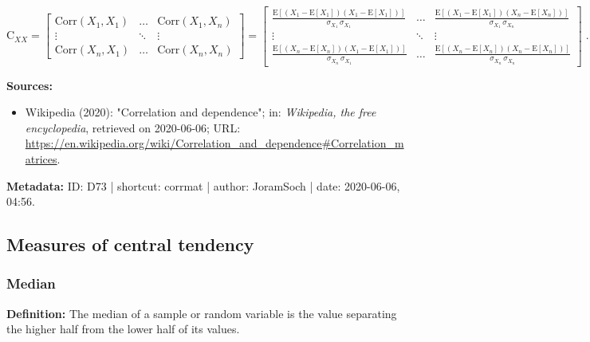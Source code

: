 \documentclass[a4paper,12pt,twoside]{book}
\begin{document}
\begin{equation} \label{eq:corrmat-corrmat}
\mathrm{C}_{XX} =
\begin{bmatrix}
\mathrm{Corr}(X_1,X_1) & \ldots & \mathrm{Corr}(X_1,X_n) \\
\vdots & \ddots & \vdots \\
\mathrm{Corr}(X_n,X_1) & \ldots & \mathrm{Corr}(X_n,X_n)
\end{bmatrix} =
\begin{bmatrix}
\frac{\mathrm{E}\left[(X_1-\mathrm{E}[X_1]) (X_1-\mathrm{E}[X_1])\right]}{\sigma_{X_1} \, \sigma_{X_1}} & \ldots & \frac{\mathrm{E}\left[(X_1-\mathrm{E}[X_1]) (X_n-\mathrm{E}[X_n])\right]}{\sigma_{X_1} \, \sigma_{X_n}} \\
\vdots & \ddots & \vdots \\
\frac{\mathrm{E}\left[(X_n-\mathrm{E}[X_n]) (X_1-\mathrm{E}[X_1])\right]}{\sigma_{X_n} \, \sigma_{X_1}} & \ldots & \frac{\mathrm{E}\left[(X_n-\mathrm{E}[X_n]) (X_n-\mathrm{E}[X_n])\right]}{\sigma_{X_n} \, \sigma_{X_n}}
\end{bmatrix} \; .
\end{equation}


\vspace{1em}
\textbf{Sources:}
\begin{itemize}
\item Wikipedia (2020): "Correlation and dependence"; in: \textit{Wikipedia, the free encyclopedia}, retrieved on 2020-06-06; URL: \url{https://en.wikipedia.org/wiki/Correlation_and_dependence#Correlation_matrices}.
\end{itemize}


\vspace{1em}
\textbf{Metadata:} ID: D73 | shortcut: corrmat | author: JoramSoch | date: 2020-06-06, 04:56.
\vspace{1em}



\subsection{Measures of central tendency}

\subsubsection[\textit{Median}]{Median} \label{sec:med}
\setcounter{equation}{0}

\textbf{Definition:} The median of a sample or random variable is the value separating the higher half from the lower half of its values.
\end{document}

